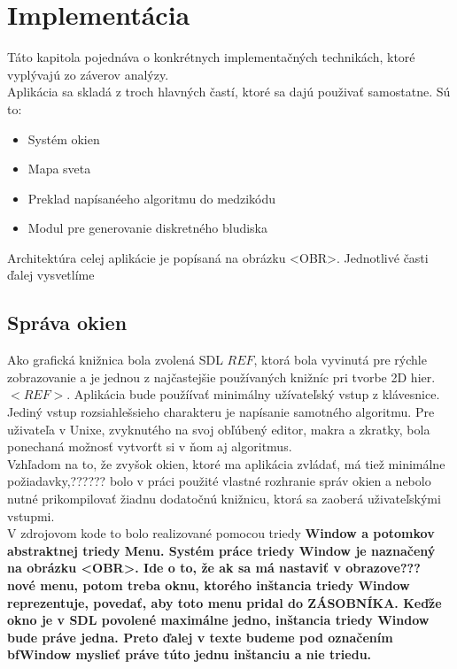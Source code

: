 \chapter{Implementácia} 
Táto kapitola pojednáva o konkrétnych implementačných technikách, ktoré  vyplývajú zo záverov  analýzy. \\
Aplikácia sa skladá z troch hlavných častí, ktoré sa dajú použivať samostatne. Sú to:
\begin{itemize}
\item Systém okien 
\item Mapa sveta %
\item Preklad napísanéeho algoritmu do medzikódu
\item Modul pre generovanie diskretného bludiska
\end{itemize}

Architektúra celej aplikácie je popísaná na obrázku <OBR>. Jednotlivé časti ďalej vysvetlíme
\section{Správa okien}
Ako grafická knižnica bola zvolená SDL $REF$, ktorá bola vyvinutá pre rýchle zobrazovanie a je jednou z najčastejšie používaných knižníc pri tvorbe 2D hier. $<REF>$. Aplikácia bude použíívať minimálny užívateľský vstup z klávesnice. Jediný vstup rozsiahlešsieho charakteru je napísanie samotného algoritmu. Pre uživateľa v Unixe, zvyknutého na svoj obľúbený editor, makra a zkratky, bola ponechaná možnosť vytvorťt si v ňom aj  algoritmus. \\ %
Vzhľadom na to, že zvyšok okien, ktoré ma aplikácia zvládať, má tiež minimálne požiadavky,?????? bolo v práci použité vlastné rozhranie správ okien a nebolo nutné prikompilovať žiadnu dodatočnú knižnicu, ktorá sa zaoberá uživateľskými vstupmi.\\
V zdrojovom kode to bolo realizované pomocou triedy \bf{Window} a potomkov abstraktnej triedy \bf{Menu}. Systém práce triedy  \bf{Window} je naznačený na obrázku <OBR>. Ide o to, že ak sa má nastaviť v obrazove??? nové menu, potom treba oknu, ktorého inštancia triedy Window reprezentuje, povedať, aby toto menu pridal do ZÁSOBNÍKA. Keďže okno je v SDL povolené maximálne jedno, inštancia triedy \bf{Window} bude práve jedna. Preto ďalej v texte budeme pod označením bf{Window} myslieť práve túto jednu inštanciu a nie triedu.\\

